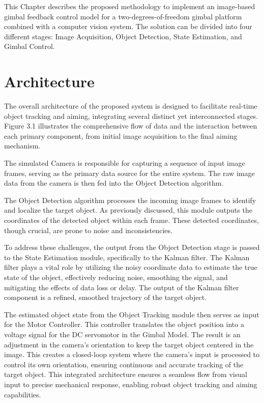 This Chapter describes the proposed methodology to implement an image-based gimbal feedback control model for a two-degrees-of-freedom gimbal platform combined with a computer vision system. The solution can be divided into four different stages: Image Acquisition, Object Detection, State Estimation, and Gimbal Control. 

\section{Architecture}
The overall architecture of the proposed system is designed to facilitate real-time object tracking and aiming, integrating several distinct yet interconnected stages. Figure 3.1 illustrates the comprehensive flow of data and the interaction between each primary component, from initial image acquisition to the final aiming mechanism.

The simulated Camera is responsible for capturing a sequence of input image frames, serving as the primary data source for the entire system. The raw image data from the camera is then fed into the Object Detection algorithm.

The Object Detection algorithm processes the incoming image frames to identify and localize the target object. As previously discussed, this module outputs the coordinates of the detected object within each frame. These detected coordinates, though crucial, are prone to noise and inconsistencies.

To address these challenges, the output from the Object Detection stage is passed to the State Estimation module, specifically to the Kalman filter. The Kalman filter plays a vital role by utilizing the noisy coordinate data to estimate the true state of the object, effectively reducing noise, smoothing the signal, and mitigating the effects of data loss or delay. The output of the Kalman filter component is a refined, smoothed trajectory of the target object.

The estimated object state from the Object Tracking module then serves as input for the Motor Controller. This controller translates the object position into a voltage signal for the DC servomotor in the Gimbal Model. The result is an adjustment in the camera's orientation to keep the target object centered in the image. This creates a closed-loop system where the camera's input is processed to control its own orientation, ensuring continuous and accurate tracking of the target object. This integrated architecture ensures a seamless flow from visual input to precise mechanical response, enabling robust object tracking and aiming capabilities.

